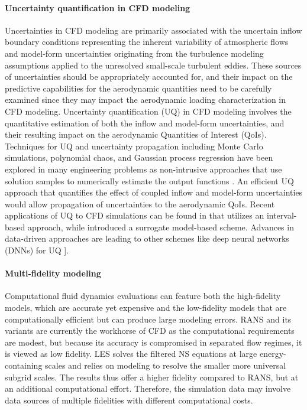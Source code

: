 \paragraph{Uncertainty quantification in CFD modeling} Uncertainties in CFD modeling are primarily associated with the uncertain inflow boundary conditions representing the inherent variability of atmospheric flows and model-form uncertainties originating from the turbulence modeling assumptions applied to the unresolved small-scale turbulent eddies. These sources of uncertainties should be appropriately accounted for, and their impact on the predictive capabilities for the aerodynamic quantities need to be carefully examined since they may impact the aerodynamic loading characterization in CFD modeling. Uncertainty quantification (UQ) in CFD modeling involves the quantitative estimation of both the inflow and model-form uncertainties, and their resulting impact on the aerodynamic Quantities of Interest (QoIs). Techniques for UQ and uncertainty propagation including Monte Carlo simulations, polynomial chaos, and Gaussian process regression have been explored in many engineering problems as non-intrusive approaches that use solution samples to numerically estimate the output functions \citep{beran2017uncertainty}. An efficient UQ approach that quantifies the effect of coupled inflow and model-form uncertainties would allow propagation of uncertainties to the aerodynamic QoIs. Recent applications of UQ to CFD simulations can be found in \citep{gorle2015quantifying} that utilizes an interval-based approach, while \citep{ding2019inflow} introduced a surrogate model-based scheme. Advances in data-driven approaches are leading to other schemes like deep neural networks (DNNs) for UQ  \citep[e.g.,][]{ling2016reynolds, luo2019deep}].

\paragraph{Multi-fidelity modeling} Computational fluid dynamics evaluations can feature both the high-fidelity models, which are accurate yet expensive and the low-fidelity models that are computationally efficient but can produce large modeling errors. RANS and its variants are currently the workhorse of CFD \citep{kareem2017computational} as the computational requirements are modest, but because its accuracy is compromised in separated flow regimes, it is viewed as low fidelity. LES solves the filtered NS equations at large energy-containing scales and relies on modeling to resolve the smaller more universal subgrid scales. The results thus offer a higher fidelity compared to RANS, but at an additional computational effort. Therefore, the simulation data may involve data sources of multiple fidelities with different computational costs.

